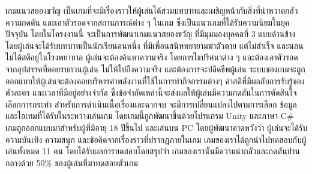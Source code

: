 \maketitle
\makesignature

\ifproject
    \begin{abstractTH}

        เกมแนวสยองขวัญ เป็นเกมที่จะมีเรื่องราวให้ผู้เล่นได้สวมบทบาทและเผชิญหน้ากับสิ่งที่น่าหวาดกลัว ความกดดัน และเอาตัวรอดจากสถานการณ์ต่าง ๆ ในเกม 
        ซึ่งเป็นแนวเกมที่ได้รับความนิยมในยุคปัจจุบัน โดยในโครงงานนี้ จะเป็นการพัฒนาเกมแนวสยองขวัญ ที่มีมุมมองบุคคลที่ 3 แบบด้านข้าง โดยผู้เล่นจะได้รับบทบาทเป็นนักเรียนคนหนึ่ง 
        ที่มีเพื่อนสนิทพยายามฆ่าตัวตาย แต่ไม่สำเร็จ และนอนไม่ได้สติอยู่ในโรงพยาบาล ผู้เล่นจะต้องค้นหาความจริง โดยการไขปริศนาต่าง ๆ และต้องเอาตัวรอดจากอุปสรรคที่คอยรบกวนผู้เล่น 
        ไม่ให้ไปถึงความจริง และต้องการจะปลิดชีพผู้เล่น ระบบของเกมจะถูกออกแบบให้ผู้เล่นจะต้องคอยบริหารค่าพลังงานที่ใช้ในการทำกิจกรรมต่างๆ ค่าสติที่มีผลกับการรับรู้ของตัวละคร 
        และเวลาที่มีอยู่อย่างจำกัด ซึ่งข้อจำกัดเหล่านี้จะส่งผลให้ผู้เล่นมีความกดดันในการตัดสินใจเลือกการกระทำ สำหรับการดำเนินเนื้อเรื่องและฉากจบ จะมีการเปลี่ยนแปลงไปตามการเลือก ข้อมูล 
        และไอเทมที่ได้รับในระหว่างเล่นเกม โดยเกมนี้ถูกพัฒนาขึ้นด้วยโปรแกรม Unity และภาษา C$\#$ เกมถูกออกแบบมาสำหรับผู้ที่มีอายุ 18 ปีขึ้นไป และเล่นบน PC โดยผู้พัฒนาคาดหวังว่า 
        ผู้เล่นจะได้รับความบันเทิง ความสนุก และข้อคิดจากเรื่องราวที่ปรากฏภายในเกม เกมของเราได้ถูกนำไปทดสอบกับผู้เล่นทั้งหมด 11 คน โดยได้รับผลการทดสอบโดยสรุปว่า เกมของเรานั้นมีความน่ากลัวและกดดันปานกลางด้วย 50$\%$ ของผู้เล่นที่มาทดสอบตัวเกม
    \end{abstractTH}

